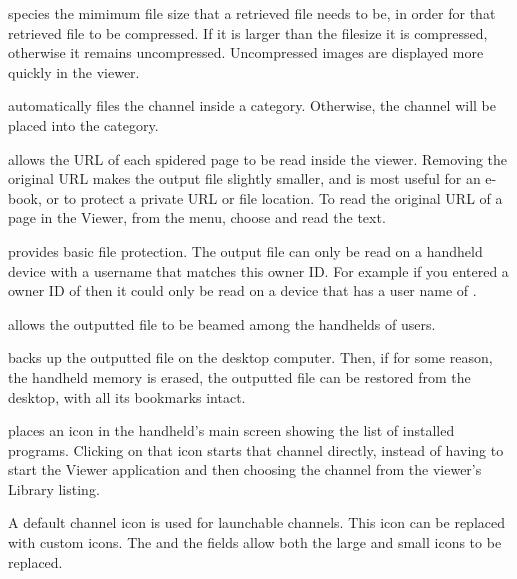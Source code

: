  species the mimimum
file size that a retrieved file needs to be, in order for that retrieved file
to be compressed. If it is larger than the filesize it is compressed,
otherwise it remains uncompressed. Uncompressed images are displayed more
quickly in the viewer.

 automatically files the channel inside a category. Otherwise,
the channel will be placed into the  category.


allows the URL of each spidered page to be read inside the viewer. Removing the
original URL makes the output file slightly smaller, and is most useful for an
e-book, or to protect a private URL or file location. To read the original URL
of a page in the Viewer, from the menu, choose
 and read the  text.

 provides basic file protection. The output file can only be read
on a handheld device with a username that matches this owner ID. For example
if you entered a owner ID of  then it could only be read on a
device that has a user name of .

 allows
the outputted file to be beamed among the handhelds of \brandingapplicationsuitename users.

 backs up the outputted file on the desktop
computer. Then, if for some reason, the handheld memory is erased, the
outputted file can be restored from the desktop, with all its bookmarks intact.

 places an icon in the handheld's main screen showing
the list of installed programs. Clicking on that icon starts that channel
directly, instead of having to start the \brandingapplicationsuitename Viewer application and then
choosing the channel from the viewer's Library listing.

A default \brandingapplicationsuitename channel icon is used for launchable channels. This icon can
be replaced with custom icons. The  and the  fields allow both the large and small icons to be replaced. 

